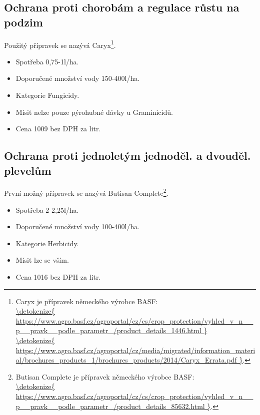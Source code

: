\subsection{Ochrana proti chorobám a regulace růstu na podzim}
Použitý přípravek se nazývá Caryx\footnote{Caryx je přípravek německého výrobce BASF: \\\url{\detokenize{
https://www.agro.basf.cz/agroportal/cz/cs/crop_protection/vyhled_v_n__p__pravk__podle_parametr_/product_details_1446.html
}}
\\\url{\detokenize{
https://www.agro.basf.cz/agroportal/cz/media/migrated/information_material/brochures_products_1/brochures_products/2014/Caryx_Errata.pdf
}}.}.
\begin{itemize}
  \item Spotřeba 0,75-1l/ha.
  \item Doporučené množství vody 150-400l/ha.
  \item Kategorie Fungicidy.
  \item Mísit nelze pouze pýrohubné dávky u Graminicidů.
  \item Cena 1009 bez DPH za litr.
\end{itemize}

\subsection{Ochrana proti jednoletým jednoděl. a dvouděl. plevelům}
První možný přípravek se nazývá Butisan Complete\footnote{Butisan Complete je přípravek německého výrobce BASF: \\\url{\detokenize{
https://www.agro.basf.cz/agroportal/cz/cs/crop_protection/vyhled_v_n__p__pravk__podle_parametr_/product_details_85632.html
}}.}.
\begin{itemize}
  \item Spotřeba 2-2,25l/ha.
  \item Doporučené množství vody 100-400l/ha.
  \item Kategorie Herbicidy.
  \item Mísit lze se vším.
  \item Cena 1016 bez DPH za litr.
\end{itemize}

